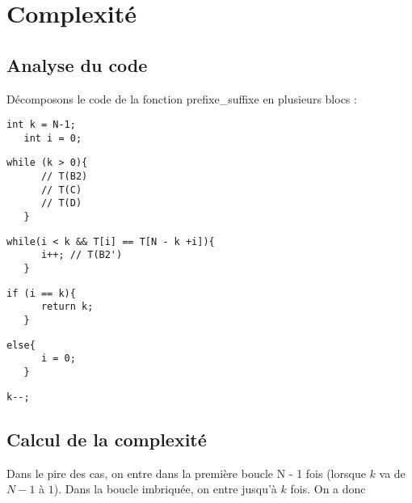 \section{Complexité}\label{complexite}
\subsection{Analyse du code}

Décomposons le code de la fonction prefixe\_suffixe en plusieurs blocs :
\begin{lstlisting}[caption={T(A)}]
   int k = N-1;
   int i = 0;
\end{lstlisting}

\begin{lstlisting}[caption={T(B1)}]
    while (k > 0){
      // T(B2)
      // T(C)
      // T(D)
   }
\end{lstlisting}

\begin{lstlisting}[caption={T(B2) et T(B2')}]
   while(i < k && T[i] == T[N - k +i]){
      i++; // T(B2')
   }
\end{lstlisting}

\begin{lstlisting}[caption={T(C)}]
   if (i == k){
      return k;
   }
\end{lstlisting}

\begin{lstlisting}[caption={T(D)}]
   else{
      i = 0;
   }
\end{lstlisting}

\begin{lstlisting}[caption={T(E)}]
    k--;
\end{lstlisting}

\subsection{Calcul de la complexité}

Dans le pire des cas, on entre dans la première boucle N - 1 fois 
(lorsque $k$ va de $N - 1$ à $1$).
Dans la boucle imbriquée, on entre jusqu'à $k$ fois. On a donc

